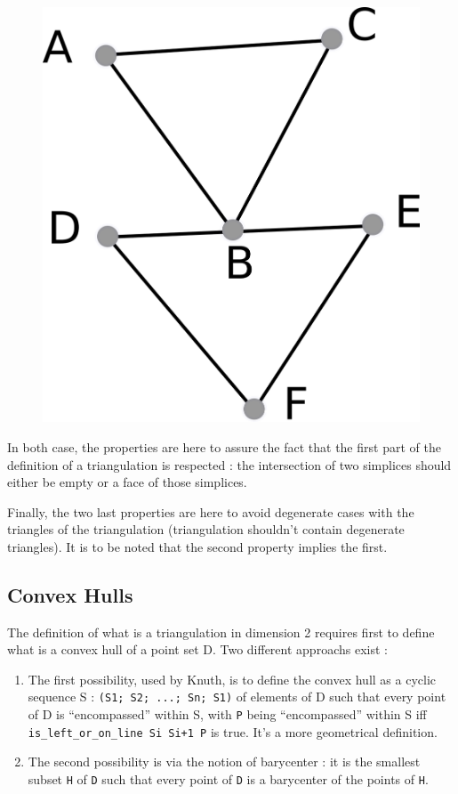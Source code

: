 \documentclass[a4paper,10pt]{article}
\begin{document}
\begin{enumerate}
\begin{figure}[h]
\includegraphics[scale=2]{nps}\\
\end{figure}
\end{enumerate}
In both case, the properties are here to assure the fact that the first part of the definition of a triangulation is respected : the intersection of two simplices should either be empty or a face of those simplices.

Finally, the two last properties are here to avoid degenerate cases with the triangles of the triangulation (triangulation shouldn't contain degenerate triangles). It is to be noted that the second property implies the first.

\subsection{Convex Hulls}

The definition of what is a triangulation in dimension 2 requires first to define what is a convex hull of a point set D.
Two different approachs exist :
\begin{enumerate}
\item The first possibility, used by Knuth,  is to define the convex hull as a cyclic sequence S : {\tt (S1; S2; ...; Sn; S1)} of elements of D such that every point of D is ``encompassed'' within S, with {\tt P} being ``encompassed'' within S iff {\tt is\_left\_or\_on\_line Si Si+1 P} is true.
  It's a more geometrical definition.
\item The second possibility is via the notion of barycenter : it is the smallest subset {\tt H} of {\tt D} such that every point of {\tt D} is a barycenter of the points of {\tt H}.
\end{enumerate}
\end{document}
